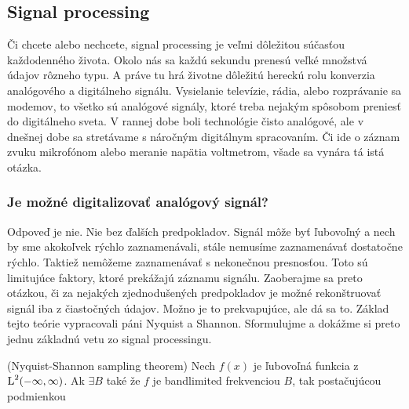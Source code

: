 \subsection{Signal processing}

Či chcete alebo nechcete, signal processing je veľmi dôležitou
súčasťou každodenného života. Okolo nás sa každú sekundu prenesú veľké
množstvá údajov rôzneho typu. A práve tu hrá životne dôležitú hereckú
rolu konverzia analógového a digitálneho signálu. Vysielanie
televízie, rádia, alebo rozprávanie sa modemov, to všetko sú analógové
signály, ktoré treba nejakým spôsobom preniesť do digitálneho sveta. V
rannej dobe boli technológie čisto analógové, ale v dnešnej dobe sa
stretávame s náročným digitálnym spracovaním. Či ide o záznam zvuku
mikrofónom alebo meranie napätia voltmetrom, všade sa vynára tá istá
otázka.

\subsubsection{Je možné digitalizovať analógový signál?}
Odpoveď je nie. Nie bez ďalších predpokladov. Signál môže byť
ľubovoľný a nech by sme akokoľvek rýchlo zaznamenávali, stále nemusíme
zaznamenávať dostatočne rýchlo. Taktiež nemôžeme zaznamenávať s
nekonečnou presnosťou. Toto sú limitujúce faktory, ktoré prekážajú
záznamu signálu. Zaoberajme sa preto otázkou, či za nejakých
zjednodušených predpokladov je možné rekonštruovať signál iba z
čiastočných údajov. Možno je to prekvapujúce, ale dá sa to. Základ
tejto teórie vypracovali páni Nyquist a Shannon. Sformulujme a dokážme
si preto jednu základnú vetu zo signal processingu.

\begin{veta}
    (Nyquist-Shannon sampling theorem) Nech $f(x)$ je ľubovoľná
    funkcia z $\mbox{L}^2(-\infty,\infty)$. Ak $\exists B$ také že $f$ je bandlimited
    frekvenciou $B$, tak postačujúcou podmienkou
\end{veta}
